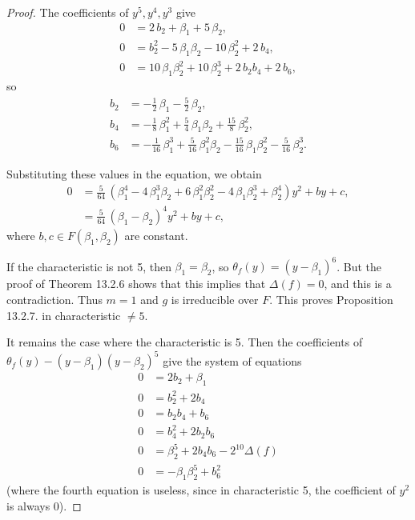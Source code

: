 \documentclass[11pt,a4paper]{article}
\begin{document}
\begin{proof}
The coefficients of $y^5,y^4,y^3$ give
\begin{align*}
0 &=2 \, b_{2} + \beta_{1} + 5 \, \beta_{2},\\
0 &= b_{2}^{2} - 5 \,\beta_{1} \beta_{2} - 10 \, \beta_{2}^{2} + 2 \, b_{4},\\
0&=  10 \, \beta_{1}\beta_{2}^{2} + 10 \, \beta_{2}^{3} + 2 \, b_{2} b_{4} + 2 \,b_{6},
\end{align*}
so
\begin{align*}
b_{2} &= -\frac{1}{2} \, \beta_{1} - \frac{5}{2} \,
\beta_{2},\\
 b_{4} &= -\frac{1}{8} \, \beta_{1}^{2} + \frac{5}{4} \,
\beta_{1} \beta_{2} + \frac{15}{8} \, \beta_{2}^{2},\\
 b_{6} &=
-\frac{1}{16} \, \beta_{1}^{3} + \frac{5}{16} \, \beta_{1}^{2} \beta_{2}
- \frac{15}{16} \, \beta_{1} \beta_{2}^{2} - \frac{5}{16} \,
\beta_{2}^{3}.
\end{align*}

Substituting these values in  the equation, we obtain
\begin{align*}
0 &=\frac{5}{64} \, {\left(\beta_{1}^{4}- 4 \, \beta_{1}^{3} \beta_{2} + 6 \, \beta_{1}^{2} \beta_{2}^{2} - 4 \,\beta_{1} \beta_{2}^{3} + \beta_{2}^{4}\right)} y^{2} + by + c,\\
&=\frac{5}{64} \, {\left(\beta_{1} - \beta_{2}\right)}^{4} y^{2} + by +c,
\end{align*}
where $b,c \in F(\beta_1,\beta_2)$ are constant.

 If the characteristic is not 5, then $\beta_1 = \beta_2$, so $\theta_f(y) = (y-\beta_1)^6$. But the proof of Theorem 13.2.6 shows that this implies that $\Delta(f) = 0$, and this is a contradiction. Thus $m=1$ and $g$ is irreducible over $F$.  This proves Proposition 13.2.7. in characteristic $\ne 5$.
 
 It remains the case where the characteristic is 5.
 Then the coefficients of $\theta_f(y) - (y-\beta_1)(y-\beta_2)^5$ give the system of equations
 \begin{align*}
 0 & = 2b_2 + \beta_1\\
 0 &= b_2^2 + 2 b_4\\
 0 &= b_2 b_4 + b_6\\
 0 &= b_4^2 + 2 b_2 b_6\\
 0 &= \beta_2^5 + 2 b_4b_6 - 2^{10} \Delta(f)\\
 0 &= -\beta_1 \beta_2^5 + b_6^2
 \end{align*}
 (where the fourth equation is useless, since in characteristic 5, the coefficient of $y^2$ is always 0).
 

\end{proof}
\end{document}
